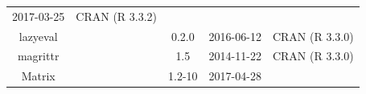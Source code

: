 \documentclass[]{article}
\begin{document}
\begin{itemize}
\begin{longtable}[]{@{}ccccc@{}}
\begin{minipage}[t]{0.13\columnwidth}
  2017-03-25\strut
  \end{minipage} & \begin{minipage}[t]{0.29\columnwidth}\centering\strut
  CRAN (R 3.3.2)\strut
  \end{minipage}\tabularnewline
  \begin{minipage}[t]{0.13\columnwidth}\centering\strut
  lazyeval\strut
  \end{minipage} & \begin{minipage}[t]{0.05\columnwidth}\centering\strut
  \strut
  \end{minipage} & \begin{minipage}[t]{0.13\columnwidth}\centering\strut
  0.2.0\strut
  \end{minipage} & \begin{minipage}[t]{0.13\columnwidth}\centering\strut
  2016-06-12\strut
  \end{minipage} & \begin{minipage}[t]{0.29\columnwidth}\centering\strut
  CRAN (R 3.3.0)\strut
  \end{minipage}\tabularnewline
  \begin{minipage}[t]{0.13\columnwidth}\centering\strut
  magrittr\strut
  \end{minipage} & \begin{minipage}[t]{0.05\columnwidth}\centering\strut
  \strut
  \end{minipage} & \begin{minipage}[t]{0.13\columnwidth}\centering\strut
  1.5\strut
  \end{minipage} & \begin{minipage}[t]{0.13\columnwidth}\centering\strut
  2014-11-22\strut
  \end{minipage} & \begin{minipage}[t]{0.29\columnwidth}\centering\strut
  CRAN (R 3.3.0)\strut
  \end{minipage}\tabularnewline
  \begin{minipage}[t]{0.13\columnwidth}\centering\strut
  Matrix\strut
  \end{minipage} & \begin{minipage}[t]{0.05\columnwidth}\centering\strut
  \strut
  \end{minipage} & \begin{minipage}[t]{0.13\columnwidth}\centering\strut
  1.2-10\strut
  \end{minipage} & \begin{minipage}[t]{0.13\columnwidth}\centering\strut
  2017-04-28\strut

\end{minipage}
\end{longtable}
\end{itemize}
\end{document}
